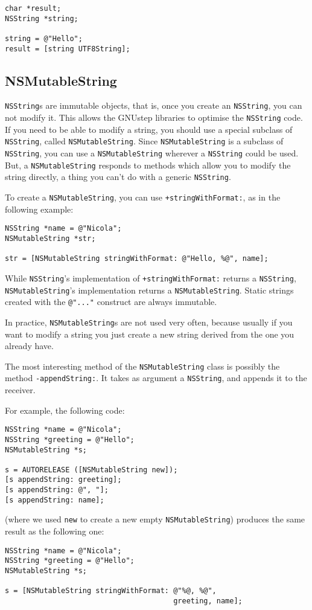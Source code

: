 \documentclass[a4paper]{article}
\begin{document}
\begin{verbatim}
char *result;
NSString *string;

string = @"Hello";
result = [string UTF8String];
\end{verbatim}

\subsection{NSMutableString}
\texttt{NSString}s are immutable objects, that is, once you create an 
\texttt{NSString}, you can not modify it.  This allows the GNUstep 
libraries to optimise the \texttt{NSString} code.  
If you need to be able to modify a string, you should use a special
subclass of \texttt{NSString}, called \texttt{NSMutableString}.
Since \texttt{NSMutableString} is a subclass of \texttt{NSString}, 
you can use a \texttt{NSMutableString} wherever a \texttt{NSString} 
could be used.  But, a \texttt{NSMutableString} responds to methods 
which allow you to modify the string directly, a thing you can't 
do with a generic \texttt{NSString}. 

To create a \texttt{NSMutableString}, you can use \texttt{+stringWithFormat:}, 
as in the following example: 
\begin{verbatim}
NSString *name = @"Nicola";
NSMutableString *str;

str = [NSMutableString stringWithFormat: @"Hello, %@", name];
\end{verbatim}
While \texttt{NSString}'s implementation of \texttt{+stringWithFormat:}
returns a \texttt{NSString}, \texttt{NSMutableString}'s implementation 
returns a \texttt{NSMutableString}.  Static strings created with the  
\texttt{@"..."} construct are always immutable.

In practice, \texttt{NSMutableString}s are not used very often,
because usually if you want to modify a string you just create a new
string derived from the one you already have.  

The most interesting method of the \texttt{NSMutableString} class is
possibly the method \texttt{-appendString:}.  It takes as argument a
\texttt{NSString}, and appends it to the receiver.

For example, the following code: 
\begin{verbatim}
NSString *name = @"Nicola";
NSString *greeting = @"Hello";
NSMutableString *s;

s = AUTORELEASE ([NSMutableString new]);
[s appendString: greeting];
[s appendString: @", "];
[s appendString: name];
\end{verbatim}
(where we used \texttt{new} to create a new empty
\texttt{NSMutableString}) produces the same result as the following
one:
\begin{verbatim}
NSString *name = @"Nicola";
NSString *greeting = @"Hello";
NSMutableString *s;

s = [NSMutableString stringWithFormat: @"%@, %@", 
                                       greeting, name];
\end{verbatim}
\end{document}
